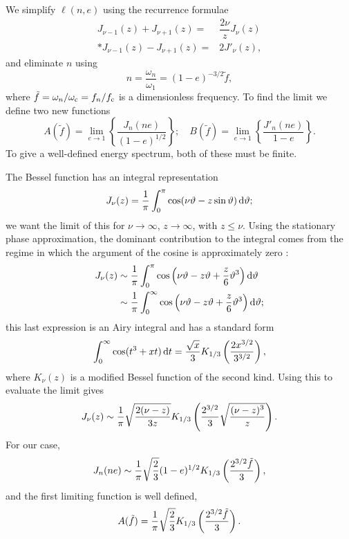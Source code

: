 We simplify $\ell(n,e)$ using the recurrence formulae \citep[section 2.12]{Watson1995}
\begin{align}
J_{\nu-1}(z) + J_{\nu+1}(z)  = {} & \dfrac{2\nu}{z}J_\nu(z)\\*
J_{\nu-1}(z) - J_{\nu+1}(z)  = {} & 2J'_\nu(z),\label{eq:J_derivative}
\end{align}
and eliminate $n$ using
\begin{equation}
n = \dfrac{\omega_n}{\omega_1} = (1-e)^{-3/2}\tilde{f},
\end{equation}
where $\tilde{f} = \omega_n/\omega_\mathrm{c} = f_n/f_\mathrm{c}$ is a dimensionless frequency. To find the limit we define two new functions \citep{Berry2010}
\begin{equation}
A(\tilde{f}) = \lim_{e\rightarrow 1}\left\{\dfrac{J_n(ne)}{(1-e)^{1/2}}\right\}; \quad B(\tilde{f}) = \lim_{e\rightarrow 1}\left\{\dfrac{J'_n(ne)}{1-e}\right\}.
\end{equation}
To give a well-defined energy spectrum, both of these must be finite.

The Bessel function has an integral representation
\begin{equation}
J_\nu(z) = \dfrac{1}{\pi}\int_{0}^{\pi}{\cos(\nu\vartheta - z\sin\vartheta)}\,\mathrm{d}{\vartheta};
\end{equation}
we want the limit of this for $\nu \rightarrow \infty$, $z \rightarrow \infty$, with $z \leq \nu$. Using the stationary phase approximation, the dominant contribution to the integral comes from the regime in which the argument of the cosine is approximately zero \citep[sections 8.2, 8.43]{Watson1995}:
\begin{align}
J_\nu(z)  \sim {} & \dfrac{1}{\pi}\int_{0}^{\pi}{\cos\left(\nu\vartheta - z\vartheta + \dfrac{z}{6}\vartheta^3\right)}\,\mathrm{d}{\vartheta}\\*
  \sim {} & \dfrac{1}{\pi}\int_{0}^{\infty}{\cos\left(\nu\vartheta - z\vartheta + \dfrac{z}{6}\vartheta^3\right)}\,\mathrm{d}{\vartheta};
\end{align}
this last expression is an Airy integral and has a standard form \citep[section 6.4]{Watson1995}
\begin{equation}
\int_{0}^{\infty}{\cos(t^3 + xt)}\,\mathrm{d}{t} = \dfrac{\sqrt{x}}{3}K_{1/3}\left(\dfrac{2x^{3/2}}{3^{3/2}}\right),
\end{equation}
where $K_\nu(z)$ is a modified Bessel function of the second kind. Using this to evaluate the limit gives
\begin{equation}
J_\nu(z) \sim \dfrac{1}{\pi}\sqrt{\dfrac{2(\nu - z)}{3z}}K_{1/3}\left(\dfrac{2^{3/2}}{3}\sqrt{\dfrac{(\nu -z)^3}{z}}\right).
\label{eq:J_nu}
\end{equation}
For our case,
\begin{equation}
J_n(ne) \sim \dfrac{1}{\pi}\sqrt{\dfrac{2}{3}}(1-e)^{1/2}K_{1/3}\left(\dfrac{2^{3/2}\tilde{f}}{3}\right),
\end{equation}
and the first limiting function is well defined,
\begin{equation}
A(\tilde{f}) = \dfrac{1}{\pi}\sqrt{\dfrac{2}{3}}K_{1/3}\left(\dfrac{2^{3/2}\tilde{f}}{3}\right).
\end{equation}

